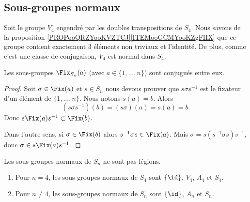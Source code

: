 \subsection{Sous-groupes normaux}

\begin{normaltext}     \label{NORMooQAZTooBQLqDn}
	Soit le groupe \( V_4\) engendré par les doubles transpositions de \( S_4\). Nous savons de la proposition \ref{PROPooQRZYooKVZTCJ}\ref{ITEMooGCMYooKZgFHX} que ce groupe contient exactement \( 3\) éléments non triviaux et l'identité. De plus, comme c'est une classe de conjugaison, \( V_4\) est normal dans \( S_4\).
\end{normaltext}

\begin{lemma}
	Les sous-groupes \( \Fix_{S_n}(a)\) (avec \( a\in\{ 1,\ldots, n \}\)) sont conjugués entre eux.
\end{lemma}

\begin{proof}
	Soit \( \sigma\in \Fix(a)\) et \( s\in S_n\) nous devons prouver que \( s \sigma s^{-1}\) est le fixateur d'un élément de \( \{ 1,\ldots, n \}\). Nous notons \( s(a)=b\). Alors
	\begin{equation}
		(s\sigma s^{-1})(b)=(s\sigma)(a)=s(a)=b.
	\end{equation}
	Donc \( s\Fix(a)s^{-1}\subset \Fix(b)\).

	Dans l'autre sens, si \( \sigma\in \Fix(b)\) alors \( s^{-1} \sigma s\in\Fix(a)\). Mais \( \sigma=s(s^{-1}\sigma s)s^{-1}\), donc \( \sigma\in s\Fix(a)s^{-1}\).
\end{proof}

\begin{proposition}     \label{PROPooOTJAooUbzGZm}
	Les sous-groupes normaux de \( S_n\) ne sont pas légions.
	\begin{enumerate}
		\item
		      Pour \( n=4\), les sous-groupes normaux de \( S_4\) sont \(  \{ \id \}  \), \( V_4\), \( A_4\) et \( S_4\).
		\item
		      Pour \( n\neq 4\), les sous-groupes normaux de \( S_n\) sont \( \{ \id \}\), \( A_n\) et \( S_n\).
	\end{enumerate}
\end{proposition}

